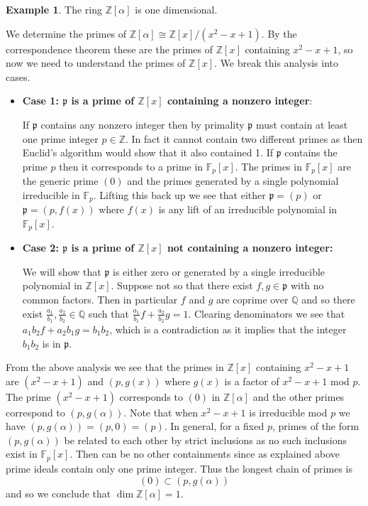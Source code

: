 \documentclass{article}
\newcommand{\p}{\ensuremath{\mathfrak{p}}}
\newcommand{\Z}{\ensuremath{\mathbb{Z}}}
\newcommand{\Q}{\ensuremath{\mathbb{Q}}}
\newcommand{\F}{\ensuremath{\mathbb{F}}}
\theoremstyle{definition}
\newcounter{dummy} \numberwithin{dummy}{section}
\newtheorem{example}[dummy]{Example}
\begin{document}
\begin{example}
  The ring $\Z\left[\alpha\right]$ is one dimensional.
\end{example}
\noindent
We determine the primes of $\Z\left[\alpha\right] \cong \Z[x]/(x^2-x+1)$.
By the correspondence theorem these are the primes of $\Z[x]$ containing $x^2-x+1$, so now we need to understand the primes of $\Z[x]$.
We break this analysis into cases.
\begin{itemize}
  \item \textbf{Case 1: $\p$ is a prime of $\Z[x]$ containing a nonzero integer}:
  
  If $\p$ contains any nonzero integer then by primality $\p$ must contain at least one prime integer $p \in \Z$.
  In fact it cannot contain two different primes as then Euclid's algorithm would show that it also contained 1.
  If $\p$ contains the prime $p$ then it corresponds to a prime in $\F_p[x]$.
  The primes in $\F_p[x]$ are the generic prime $(0)$ and the primes generated by a single polynomial irreducible in $\F_p$.
  Lifting this back up we see that either $\p = (p)$ or $\p = (p,f(x))$ where $f(x)$ is any lift of an irreducible polynomial in $\F_p[x]$.

  \item \textbf{Case 2: $\p$ is a prime of $\Z[x]$ not containing a nonzero integer:}
  
  We will show that $\p$ is either zero or generated by a single irreducible polynomial in $\Z[x]$.
  Suppose not so that there exist $f,g \in \p$ with no common factors.
  Then in particular $f$ and $g$ are coprime over $\Q$ and so there exist $\frac{a_1}{b_1},\frac{a_2}{b_2} \in \Q$ such that $\frac{a_1}{b_1}f + \frac{a_2}{b_2}g=1$.
  Clearing denominators we see that $a_1b_2f + a_2b_1g = b_1b_2$, which is a contradiction as it implies that the integer $b_1b_2$ is in $\p$.
\end{itemize}
From the above analysis we see that the primes in $\Z[x]$ containing $x^2-x+1$ are $(x^2-x+1)$ and $(p, g(x))$ where $g(x)$ is a factor of $x^2-x+1$ mod $p$.
The prime $(x^2-x+1)$ corresponds to $(0)$ in $\Z\left[\alpha\right]$ and the other primes correspond to $\left(p, g\left(\alpha\right)\right)$.
Note that when $x^2-x+1$ is irreducible mod $p$ we have $(p, g(\alpha))=(p,0)=(p)$.
In general, for a fixed $p$, primes of the form $(p, g(\alpha))$ be related to each other by strict inclusions as no such inclusions exist in $\F_p[x]$.
Then can be no other containments since as explained above prime ideals contain only one prime integer.
Thus the longest chain of primes is
$$ (0) \subset \left(p, g\left(\alpha\right)\right)$$
and so we conclude that $\dim \Z\left[\alpha\right] = 1$.
\end{document}
